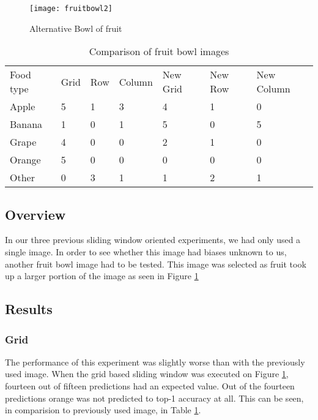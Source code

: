 \begin{figure}
    \texttt{[image: fruitbowl2]}
    \caption{Alternative Bowl of fruit}
    \label{fig:newFruit}
\end{figure}

\begin{table}[]
    \centering
    \caption{Comparison of fruit bowl images}
    \label{newFruitTable}
    \begin{tabular}{lllllll}
        Food type & Grid & Row & Column & New Grid & New Row & New Column \\
        Apple     & 5    & 1   & 3      & 4        & 1       & 0          \\
        Banana    & 1    & 0   & 1      & 5        & 0       & 5          \\
        Grape     & 4    & 0   & 0      & 2        & 1       & 0          \\
        Orange    & 5    & 0   & 0      & 0        & 0       & 0          \\
        Other     & 0    & 3   & 1      & 1        & 2       & 1         
    \end{tabular}
\end{table}

\subsection*{Overview}
In our three previous sliding window oriented experiments, we had only used a
single image. In order to see whether this image had biases unknown
to us, another fruit bowl image had to be tested. This image was selected as
fruit took up a larger portion of the image as seen in Figure \ref{fig:newFruit}

\subsection*{Results}
\subsubsection*{Grid}
The performance of this experiment was slightly worse than with the previously
used image. When the grid based sliding window was executed on Figure
\ref{fig:newFruit}, fourteen out of fifteen predictions had an expected value.
Out of the fourteen predictions orange was not predicted to top-1 accuracy at
all. This can be seen, in comparision to previously used image, in Table
\ref{newFruitTable}.

